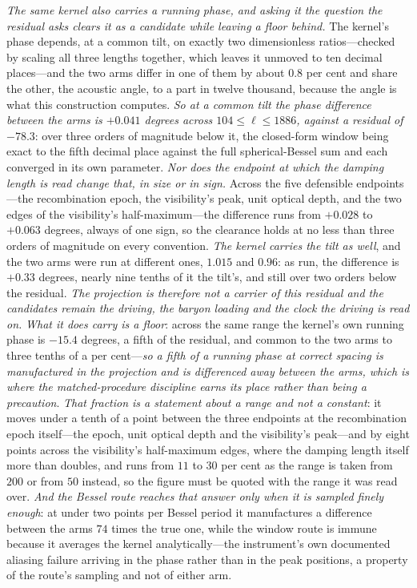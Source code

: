 \documentclass[11pt,a4paper]{article}
\theoremstyle{plain}
\theoremstyle{definition}
\theoremstyle{remark}
\begin{document}
\emph{The same kernel also carries a running phase, and asking it the question the residual asks
clears it as a candidate while leaving a floor behind.} The kernel's phase depends, at a common tilt, on exactly two
dimensionless ratios---checked by scaling all three lengths together, which leaves it unmoved to ten
decimal places---and the two arms differ in one of them by about $0.8$ per cent and share the other, the
acoustic angle, to a part in twelve thousand, because the angle is what this construction computes.
\emph{So at a common tilt the phase difference between the arms is $+0.041$ degrees across
$104\le\ell\le1886$, against a residual of $-78.3$}: over three orders of magnitude below it, the
closed-form window being exact to the fifth decimal place against the full spherical-Bessel sum and each
converged in its own parameter. \emph{Nor does the endpoint at which the damping length is read change
that, in size or in sign.} Across the five defensible endpoints---the recombination epoch, the visibility's
peak, unit optical depth, and the two edges of the visibility's half-maximum---the difference runs from
$+0.028$ to $+0.063$ degrees, always of one sign, so the clearance holds at no less than three orders of
magnitude on every convention. \emph{The kernel carries the tilt as well}, and the two arms were run at
different ones, $1.015$ and $0.96$: as run, the difference is $+0.33$ degrees, nearly nine tenths of it the
tilt's, and still over two orders below the residual. \emph{The projection is therefore not a carrier of this
residual and the candidates remain the driving, the baryon loading and the clock the driving is read
on.} \emph{What it does carry is a floor}: across the same range the kernel's own running phase is
$-15.4$ degrees, a fifth of the residual, and common to the two arms to three tenths of a per
cent---\emph{so a fifth of a running phase at correct spacing is manufactured in the projection and is
differenced away between the arms, which is where the matched-procedure discipline earns its place
rather than being a precaution}. \emph{That fraction is a statement about a range and not a constant}:
it moves under a tenth of a point between the three endpoints at the recombination epoch itself---the epoch, unit optical depth and the visibility's peak---and by eight points across the visibility's half-maximum edges, where the damping length itself more than doubles, and runs from $11$ to
$30$ per cent as the range is taken from $200$ or from $50$ instead, so the figure must be quoted with
the range it was read over. \emph{And the Bessel route reaches that
answer only when it is sampled finely enough}: at under two points per Bessel period it manufactures a
difference between the arms $74$ times the true one, while the window route is immune because it
averages the kernel analytically---the instrument's own documented aliasing failure arriving in the
phase rather than in the peak
positions, a property of the route's sampling and not of either arm.
\end{document}
